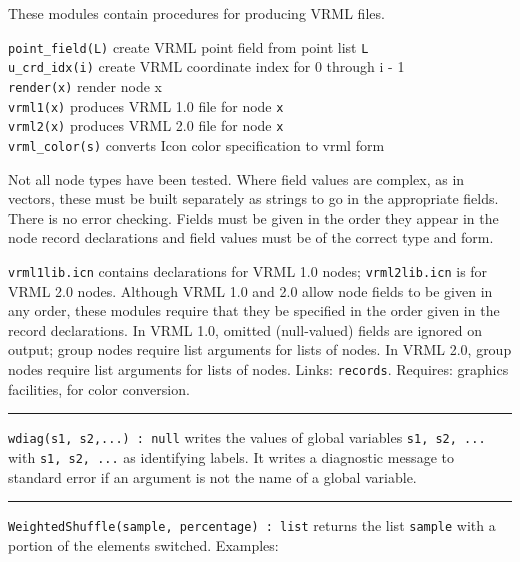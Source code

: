 These modules contain procedures for producing VRML files.

\texttt{point\_field(L)} create VRML point field from point list
\texttt{L\\
u\_crd\_idx(i)} create VRML coordinate index for 0 through i - 1\\
\texttt{render(x)} render node x\\
\texttt{vrml1(x)} produces VRML 1.0 file for node \texttt{x\\
vrml2(x)} produces VRML 2.0 file for node \texttt{x\\
vrml\_color(s)} converts Icon color specification to vrml form

Not all node types have been tested. Where field values are
complex, as in vectors, these must be built separately as strings to go
in the appropriate fields. There is no error checking. Fields must be
given in the order they appear in the node record declarations and
field values must be of the correct type and form.%

\texttt{vrml1lib.icn} contains declarations for VRML 1.0 nodes;
\texttt{vrml2lib.icn} is for VRML 2.0 nodes.
Although VRML 1.0 and 2.0 allow node fields to be given in any order,
these modules require that
they be specified in the order given in the record declarations.
In VRML 1.0, omitted (null-valued) fields are ignored on
output; group nodes require list arguments for lists of nodes.
In VRML 2.0, group nodes require list arguments for lists of nodes. 
Links: \texttt{records}. Requires: graphics facilities, for color
conversion. 

\vspace{0.25cm}\hrule{}

\texttt{wdiag(s1, s2,...) : null} writes the values of global
variables \texttt{s1, s2, ...} with \texttt{s1, s2, ...} as
identifying labels. It writes a diagnostic message to standard error
if an argument is not the name of a global variable.

\vspace{0.25cm}\hrule{}

\texttt{WeightedShuffle(sample, percentage) : list} returns the list
\texttt{sample} with a portion of the elements switched. Examples:

